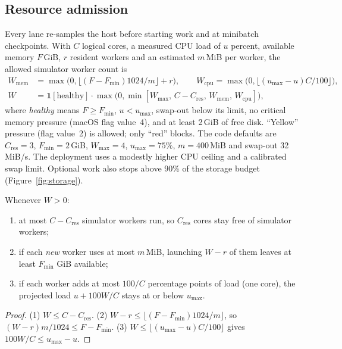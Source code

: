 \subsection{Resource admission}
Every lane re-samples the host before starting work and at minibatch
checkpoints. With $C$ logical cores, a measured CPU load of $u$ percent,
available memory $F$\,GiB, $r$ resident workers and an estimated $m$\,MiB per
worker, the allowed simulator worker count is
\begin{align}
  W_{\mathrm{mem}}&=\max\!\big(0,\lfloor(F-F_{\min})1024/m\rfloor+r\big),\qquad
  W_{\mathrm{cpu}}=\max\!\big(0,\lfloor(u_{\max}-u)C/100\rfloor\big),\\
  W&=\mathbf 1[\text{healthy}]\cdot\max\!\big(0,\min[W_{\max},\,C-C_{\mathrm{res}},\,W_{\mathrm{mem}},\,W_{\mathrm{cpu}}]\big),
\end{align}
where \emph{healthy} means $F\ge F_{\min}$, $u<u_{\max}$, swap-out below its
limit, no critical memory pressure (macOS
 flag value~4), and at least 2\,GiB
of free disk. ``Yellow'' pressure (flag value~2) is allowed; only ``red''
blocks. The code
defaults are $C_{\mathrm{res}}=3$, $F_{\min}=2$\,GiB, $W_{\max}=4$,
$u_{\max}=75\%$, $m=400$\,MiB and swap-out 32\,MiB/s. The deployment uses a
modestly higher CPU ceiling and a calibrated swap limit. Optional work also
stops above 90\% of the storage budget (Figure~\ref{fig:storage}).

\begin{proposition}
\label{prop:headroom}
Whenever $W>0$:
\begin{enumerate}
  \item at most $C-C_{\mathrm{res}}$ simulator workers run, so $C_{\mathrm{res}}$
    cores stay free of simulator workers;
  \item if each \emph{new} worker uses at most $m$\,MiB, launching $W-r$ of them
    leaves at least $F_{\min}$ GiB available;
  \item if each worker adds at most $100/C$ percentage points of load (one core),
    the projected load $u+100W/C$ stays at or below $u_{\max}$.
\end{enumerate}
\end{proposition}
\begin{proof}
(1) $W\le C-C_{\mathrm{res}}$. (2) $W-r\le\lfloor(F-F_{\min})1024/m\rfloor$, so
$(W-r)m/1024\le F-F_{\min}$. (3) $W\le\lfloor(u_{\max}-u)C/100\rfloor$ gives
$100W/C\le u_{\max}-u$.
\end{proof}

